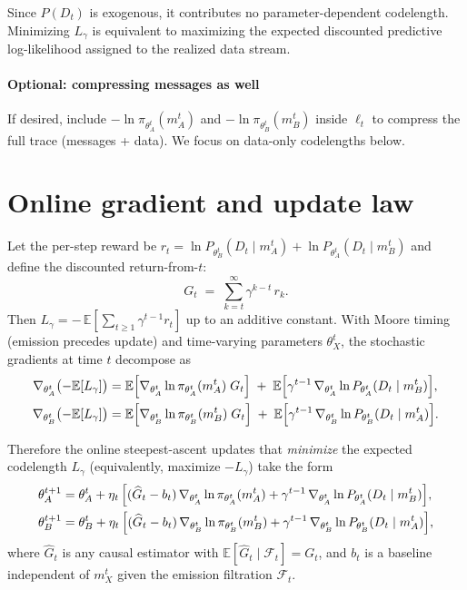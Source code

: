 \documentclass{article}
\begin{document}
Since $P(D_t)$ is exogenous, it contributes no parameter-dependent codelength. Minimizing $L_\gamma$ is equivalent to maximizing the expected discounted predictive log-likelihood assigned to the realized data stream.

\paragraph{Optional: compressing messages as well} If desired, include $-\ln\pi_{\theta_A^t}(m_A^t)$ and $-\ln\pi_{\theta_B^t}(m_B^t)$ inside $\ell_t$ to compress the full trace (messages + data). We focus on data-only codelengths below.

\section{Online gradient and update law}
Let the per-step reward be $r_t = \ln P_{\theta_B^t}(D_t\mid m_A^t) + \ln P_{\theta_A^t}(D_t\mid m_B^t)$ and define the discounted return-from-$t$:
\[
  G_t \;=\; \sum_{k=t}^{\infty} \gamma^{k-t}\, r_k.
\]
Then $L_\gamma = -\,\mathbb{E}[\sum_{t\ge 1} \gamma^{t-1} r_t]$ up to an additive constant. With Moore timing (emission precedes update) and time-varying parameters $\theta_X^t$, the stochastic gradients at time $t$ decompose as
\begin{align*}
\nabla_{\theta_A^t} \bigl(-\mathbb{E}[L_\gamma]\bigr)
&= \mathbb{E}\Bigl[\nabla_{\theta_A^t} \ln\pi_{\theta_A^t}(m_A^t)\; G_t\Bigr]
  \; + \; \mathbb{E}\Bigl[\gamma^{t-1}\, \nabla_{\theta_A^t} \ln P_{\theta_A^t}(D_t\mid m_B^t)\Bigr],\\
\nabla_{\theta_B^t} \bigl(-\mathbb{E}[L_\gamma]\bigr)
&= \mathbb{E}\Bigl[\nabla_{\theta_B^t} \ln\pi_{\theta_B^t}(m_B^t)\; G_t\Bigr]
  \; + \; \mathbb{E}\Bigl[\gamma^{t-1}\, \nabla_{\theta_B^t} \ln P_{\theta_B^t}(D_t\mid m_A^t)\Bigr].
\end{align*}

Therefore the online steepest-ascent updates that \emph{minimize} the expected codelength $L_\gamma$ (equivalently, maximize $-L_\gamma$) take the form
\begin{align*}
\theta_A^{t+1} &= \theta_A^t + \eta_t\,\Bigl[(\widehat G_t - b_t)\, \nabla_{\theta_A^t}\ln\pi_{\theta_A^t}(m_A^t) + \gamma^{t-1}\, \nabla_{\theta_A^t}\ln P_{\theta_A^t}(D_t\mid m_B^t)\Bigr],\\
\theta_B^{t+1} &= \theta_B^t + \eta_t\,\Bigl[(\widehat G_t - b_t)\, \nabla_{\theta_B^t}\ln\pi_{\theta_B^t}(m_B^t) + \gamma^{t-1}\, \nabla_{\theta_B^t}\ln P_{\theta_B^t}(D_t\mid m_A^t)\Bigr],
\end{align*}
where $\widehat G_t$ is any causal estimator with $\mathbb{E}[\widehat G_t\mid\mathcal{F}_t]=G_t$, and $b_t$ is a baseline independent of $m_X^t$ given the emission filtration $\mathcal{F}_t$.
\end{document}
